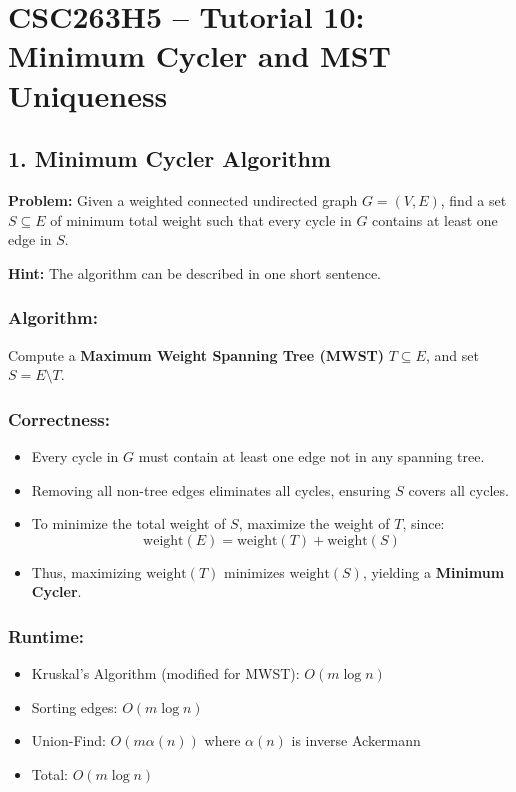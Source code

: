 \documentclass[12pt]{article}
\begin{document}
\renewcommand{\familydefault}{\rmdefault}



\section*{CSC263H5 – Tutorial 10: Minimum Cycler and MST Uniqueness}

\subsection*{1. Minimum Cycler Algorithm}

\textbf{Problem:} Given a weighted connected undirected graph \( G = (V, E) \), find a set \( S \subseteq E \) of minimum total weight such that every cycle in \( G \) contains at least one edge in \( S \).

\textbf{Hint:} The algorithm can be described in one short sentence.

\subsubsection*{Algorithm:}

Compute a \textbf{Maximum Weight Spanning Tree (MWST)} \( T \subseteq E \), and set \( S = E \setminus T \).

\subsubsection*{Correctness:}
\begin{itemize}
    \item Every cycle in \( G \) must contain at least one edge not in any spanning tree.
    \item Removing all non-tree edges eliminates all cycles, ensuring \( S \) covers all cycles.
    \item To minimize the total weight of \( S \), maximize the weight of \( T \), since:
    \[
    \text{weight}(E) = \text{weight}(T) + \text{weight}(S)
    \]
    \item Thus, maximizing \( \text{weight}(T) \) minimizes \( \text{weight}(S) \), yielding a \textbf{Minimum Cycler}.
\end{itemize}

\subsubsection*{Runtime:}
\begin{itemize}
    \item Kruskal’s Algorithm (modified for MWST): \( O(m \log n) \)
    \item Sorting edges: \( O(m \log n) \)
    \item Union-Find: \( O(m \alpha(n)) \) where \( \alpha(n) \) is inverse Ackermann
    \item Total: \( O(m \log n) \)
\end{itemize}
\end{document}

